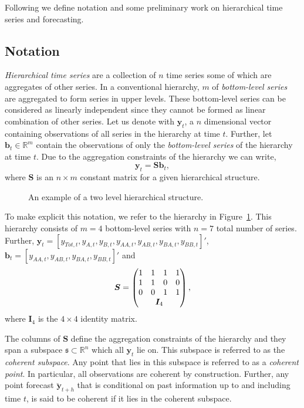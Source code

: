 \documentclass[12pt]{article}
\theoremstyle{definition}
\begin{document}
Following \citep{PanEtAl2019HF} we define notation and some preliminary work on hierarchical time series and forecasting.

\subsection{Notation}\label{sec:notation_chap3}

\emph{Hierarchical time series} are a collection of $n$ time series some of which are aggregates of other series. In a conventional hierarchy, $m$ of \emph{bottom-level series} are aggregated to form series in upper levels. These bottom-level series can be considered as linearly independent since they cannot be formed as linear combination of other series. Let us denote with $\bm{y}_t$, a $n$ dimensional vector containing observations of all series in the hierarchy at time $t$. Further, let $\bm{b}_t \in \mathbb{R}^m$ contain the observations of only the \emph{bottom-level series} of the hierarchy at time $t$. Due to the aggregation constraints of the hierarchy we can write,
\begin{equation}\label{eq:coheObservations}
\bm{y}_t = \bm{Sb}_t,
\end{equation}
where $\bm{S}$ is an $n \times m$ constant matrix for a given hierarchical structure.

\begin{figure}[H]
	\begin{center}
		 
		 
		\qobitree
	\end{center}
	\caption{An example of a two level hierarchical structure.}\label{fig:twoL-hier}
\end{figure}

To make explicit this notation, we refer to the hierarchy in Figure~\ref{fig:twoL-hier}. This hierarchy consists of $m=4$ bottom-level series with $n=7$ total number of series. Further, $\bm{y}_t = [y_{Tot,t},y_{A,t}, y_{B,t},y_{AA,t}, y_{AB,t}, y_{BA,t}, y_{BB,t}]'$, $\bm{b}_t = [y_{AA,t}, y_{AB,t}, y_{BA,t}, y_{BB,t}]'$ and
\[
\bm{S} = \begin{pmatrix}
1 & 1 & 1 & 1 \\
1 & 1 & 0 & 0 \\
0 & 0 & 1 & 1 \\
& \multicolumn{2}{c}{\bm{I}_4} &
\end{pmatrix},
\]
where $\bm{I}_4$ is the $4\times 4$ identity matrix.

The columns of $\bm{S}$ define the aggregation constraints of the hierarchy and they span a subspace $\mathfrak{s} \subset \mathbb{R}^n$ which all $\bm{y}_t$ lie on. This subspace is referred to as the \emph{coherent subspace}. Any point that lies in this subspace is referred to as a \emph{coherent point}. In particular, all observations are coherent by construction. Further, any point forecast $\bm{\breve{y}}_{t+h}$ that is conditional on past information up to and including time $t$, is said to be coherent if it lies in the coherent subspace.
\end{document}
